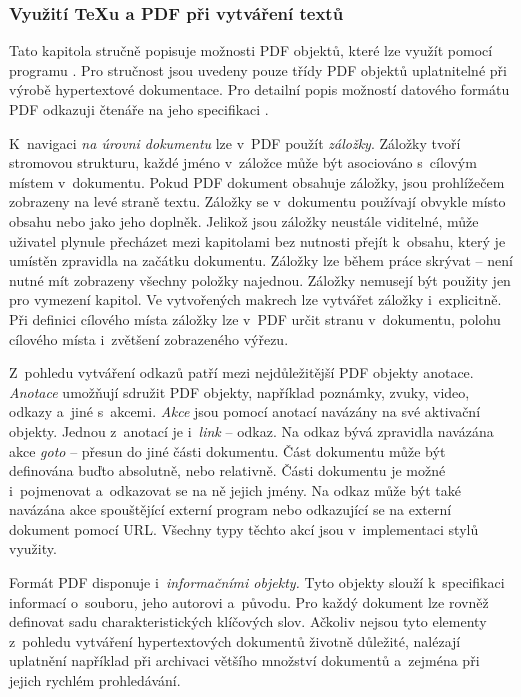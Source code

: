 \documentclass[12pt]{article}
\begin{document}
\subsubsection*{Využití \TeX u a PDF při vytváření textů}
Tato kapitola stručně popisuje možnosti PDF objektů, které lze využít
pomocí programu . Pro stručnost jsou uvedeny pouze třídy
PDF objektů uplatnitelné při výrobě hypertextové dokumentace.
Pro detailní popis možností datového formátu PDF odkazuji čtenáře na jeho
specifikaci \cite{pdfrm}.

\medskip
K~navigaci \emph{na úrovni dokumentu} lze v~PDF
použít \emph{záložky}. Záložky tvoří stromovou strukturu, každé
jméno v~záložce může být asociováno s~cílovým místem v~dokumentu. Pokud PDF
dokument obsahuje záložky, jsou prohlížečem zobrazeny na levé straně textu.
Záložky se v~dokumentu používají obvykle místo obsahu nebo jako jeho
doplněk. Jelikož jsou záložky neustále viditelné, může uživatel plynule
přecházet mezi kapitolami bez nutnosti přejít k~obsahu, 
který je umístěn zpravidla na začátku dokumentu.
Záložky lze během práce skrývat -- není nutné mít
zobrazeny všechny položky najednou.
Záložky nemusejí být použity jen pro vymezení kapitol. Ve vytvořených makrech
lze vytvářet záložky i~explicitně. Při definici cílového místa záložky lze
v~PDF určit stranu v~dokumentu, polohu cílového místa i~zvětšení 
zobrazeného výřezu.

\medskip
Z~pohledu vytváření odkazů patří mezi nejdůležitější PDF objekty 
anotace. \emph{Anotace} umožňují sdružit PDF objekty, 
například poznámky, zvuky, video, odkazy a~jiné s~akcemi.
\emph{Akce} jsou pomocí anotací navázány na své aktivační
objekty. Jednou z~anotací je i~\emph{link} -- odkaz. Na odkaz bývá zpravidla
navázána akce \emph{goto} -- přesun do jiné části dokumentu. Část dokumentu
může být definována buďto absolutně, nebo relativně. Části dokumentu je možné
i~pojmenovat a~odkazovat se na ně jejich jmény. Na odkaz může být také navázána
akce spouštějící externí program nebo odkazující se na externí dokument 
pomocí URL. Všechny typy těchto akcí jsou v~implementaci stylů využity.

\medskip
Formát PDF disponuje i~\emph{informačními objekty.}
Tyto objekty slouží k~specifikaci informací o~souboru, jeho autorovi a~původu.
Pro každý dokument lze rovněž definovat sadu charakteristických klíčových slov.
Ačkoliv nejsou tyto elementy z~pohledu vytváření hypertextových dokumentů
životně důležité, nalézají uplatnění například při archivaci většího množství
dokumentů a~zejména při jejich rychlém prohledávání.
\end{document}
